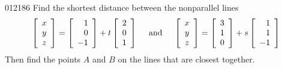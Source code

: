 \begin{example}{}{012186}
Find the shortest distance between the nonparallel lines
\begin{equation*}
\left[
\begin{array}{c}
x\\
y\\
z
\end{array}
\right]
=
\left[
\begin{array}{r}
1\\
0\\
-1
\end{array}
\right]
+t
\left[
\begin{array}{r}
2\\
0\\
1
\end{array}
\right] \quad
\mbox{ and } \quad
\left[
\begin{array}{c}
x\\
y\\
z
\end{array}
\right]
=
\left[
\begin{array}{r}
3\\
1\\
0
\end{array}
\right]
+s
\left[
\begin{array}{r}
1\\
1\\
-1
\end{array}
\right]
\end{equation*}
Then find the points $A$ and $B$ on the lines that are closest together.




\end{example}
